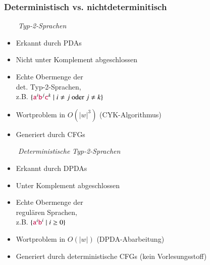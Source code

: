 \documentclass[aspectratio=1610,onlymath]{beamer}
\begin{document}
\begin{frame}\frametitle{Deterministisch vs. nichtdeterminitisch}

\begin{minipage}[t]{5.7cm}
~~~~\emph{Typ-2-Sprachen}\\
\begin{itemize}
\item Erkannt durch PDAs
\item Nicht unter Komplement abgeschlossen
\item Echte Obermenge der\\ det. Typ-2-Sprachen,\\ z.B. $\{\mathtt{\textcolor{purple}{a}}^i\mathtt{\textcolor{purple}{b}}^j\mathtt{\textcolor{purple}{c}}^k\mid i\neq j \text{ oder }j\neq k\}$
\item Wortproblem in $O(|w|^3)$ (CYK-Algorithmus)
\item Generiert durch CFGs
\end{itemize}
\end{minipage}
\begin{minipage}[t]{5.7cm}
~~~~\emph{Deterministische} %
\emph{Typ-2-Sprachen}\\
\begin{itemize}
\item Erkannt durch DPDAs
\item Unter Komplement abgeschlossen
\item Echte Obermenge der\\ regulären Sprachen,\\ z.B. $\{\mathtt{\textcolor{purple}{a}}^i\mathtt{\textcolor{purple}{b}}^i\mid i\geq 0\}$
\item Wortproblem in $O(|w|)$ (DPDA-Abarbeitung)
\item Generiert durch deterministische CFGs (kein Vorlesungsstoff)
\end{itemize}
\end{minipage}

\end{frame}

\end{document}

